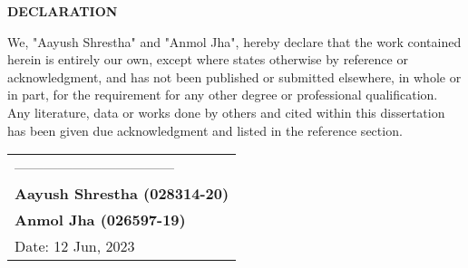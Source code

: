 




\begin{center}
	{\Large{\bf{DECLARATION}}}
\end{center}


\noindent
We, "Aayush Shrestha" and "Anmol Jha", hereby declare that the work contained herein is entirely our own, except where states otherwise by reference or acknowledgment, and has not been published or submitted elsewhere, in whole or in part,  for the requirement for any other degree or professional qualification.  Any literature, data or works done by others and cited within this dissertation has been given due acknowledgment and listed in the reference section. 



\vspace{3cm}





	
\noindent
\hspace{10cm}
\begin{tabular}{l}
	---------------------------------\\
	{\bf  Aayush Shrestha (028314-20)}\\
	{\bf Anmol Jha (026597-19)} \\
	Date: 12 Jun, 2023
\end{tabular}



